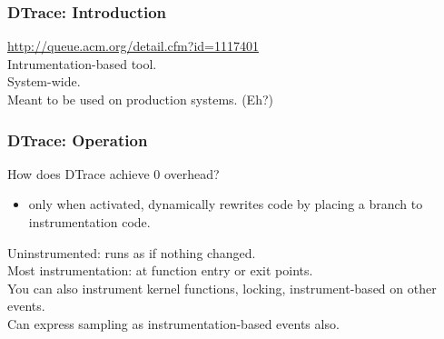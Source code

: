 \begin{frame}
  \frametitle{DTrace: Introduction}


    \url{http://queue.acm.org/detail.cfm?id=1117401}\\[1em]

    Intrumentation-based tool.\\
    System-wide.\\
    Meant to be used on production systems. (Eh?)\\[1em]

\end{frame}

\begin{frame}
  \frametitle{DTrace: Operation}


    How does DTrace achieve 0 overhead?\\
\begin{itemize}
    \item only when activated, dynamically rewrites code by placing a branch to
      instrumentation code.
\end{itemize}

    Uninstrumented: runs as if nothing changed.\\[1em]

    Most instrumentation: at function entry or exit points.\\
    You can also instrument kernel functions, locking, instrument-based
      on other events.\\[1em]

    Can express sampling as instrumentation-based events also.

\end{frame}

